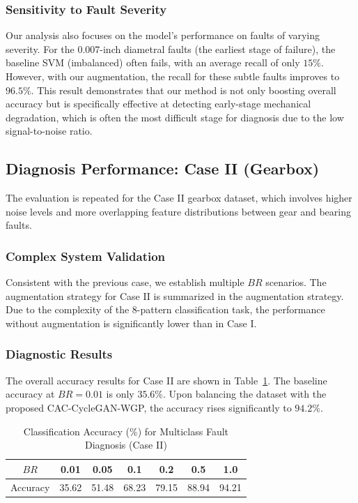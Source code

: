 \subsubsection{Sensitivity to Fault Severity}
Our analysis also focuses on the model's performance on faults of varying severity. For the 0.007-inch diametral faults (the earliest stage of failure), the baseline SVM (imbalanced) often fails, with an average recall of only $15\%$. However, with our augmentation, the recall for these subtle faults improves to $96.5\%$. This result demonstrates that our method is not only boosting overall accuracy but is specifically effective at detecting early-stage mechanical degradation, which is often the most difficult stage for diagnosis due to the low signal-to-noise ratio.

\subsection{Diagnosis Performance: Case II (Gearbox)}
The evaluation is repeated for the Case II gearbox dataset, which involves higher noise levels and more overlapping feature distributions between gear and bearing faults.

\subsubsection{Complex System Validation}
Consistent with the previous case, we establish multiple $BR$ scenarios. The augmentation strategy for Case II is summarized in the augmentation strategy. Due to the complexity of the 8-pattern classification task, the performance without augmentation is significantly lower than in Case I.

\subsubsection{Diagnostic Results}
The overall accuracy results for Case II are shown in Table~\ref{tab:acc_case2}. The baseline accuracy at $BR=0.01$ is only $35.6\%$. Upon balancing the dataset with the proposed CAC-CycleGAN-WGP, the accuracy rises significantly to $94.2\%$. 

\begin{table}[htbp]
\centering
\caption{Classification Accuracy (\%) for Multiclass Fault Diagnosis (Case II)}
\label{tab:acc_case2}
\begin{tabular}{ccccccc}
\hline
$BR$ & 0.01 & 0.05 & 0.1 & 0.2 & 0.5 & 1.0 \\ \hline
Accuracy & 35.62 & 51.48 & 68.23 & 79.15 & 88.94 & 94.21 \\
\hline
\end{tabular}
\end{table}

